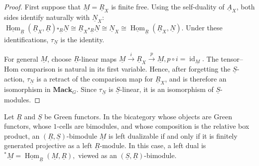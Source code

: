 \documentclass[11pt,oneside]{amsart}
\DeclareMathOperator{\Hom}{Hom}
\DeclareMathOperator{\id}{id}
\numberwithin{equation}{section}
\numberwithin{figure}{section}
\theoremstyle{plain}
\theoremstyle{definition}
\theoremstyle{remark}
\begin{document}
\begin{proof}
First suppose that \(\underline M=\underline R_X\) is finite free.
Using the self-duality of \(\underline A_X\), both sides identify
naturally with \(\underline N_X\):
\(
\underline{\Hom}_{\underline R}(\underline R_X,\underline R)
 \square_{\underline R}\underline N
\cong
\underline R_X\square_{\underline R}\underline N
\cong
\underline N_X
\cong
\underline{\Hom}_{\underline R}(\underline R_X,\underline N).
\)
Under these identifications, \(\tau_{\underline N}\) is the identity.

For general \(\underline M\), choose \(\underline R\)-linear maps
\(
\underline M\xrightarrow{i}\underline R_X
\xrightarrow{p}\underline M,
p \circ i=\id_{\underline M}.
\)
The tensor--Hom comparison is natural in its first variable.  Hence, after
forgetting the \(\underline S\)-action, \(\tau_{\underline N}\) is a
retract of the comparison map for \(\underline R_X\), and is therefore an
isomorphism in \(\mathbf{Mack}_G\).  Since \(\tau_{\underline N}\) is
\(\underline S\)-linear, it is an isomorphism of
\(\underline S\)-modules.
\end{proof}

\begin{prop}\label{prop:dualizable-bimodule}
Let \(\underline R\) and \(\underline S\) be Green functors.  In the
bicategory whose objects are Green functors, whose \(1\)-cells are
bimodules, and whose composition is the relative box product, an
\((\underline R,\underline S)\)-bimodule
\(\underline M\)
is left dualizable if and only if it is finitely generated projective as a
left \(\underline R\)-module.  In this case, a left dual is
\(
{}^*\underline M
=
\underline{\Hom}_{\underline R}(\underline M,\underline R),
\)
viewed as an \((\underline S,\underline R)\)-bimodule.
\end{prop}
\end{document}
